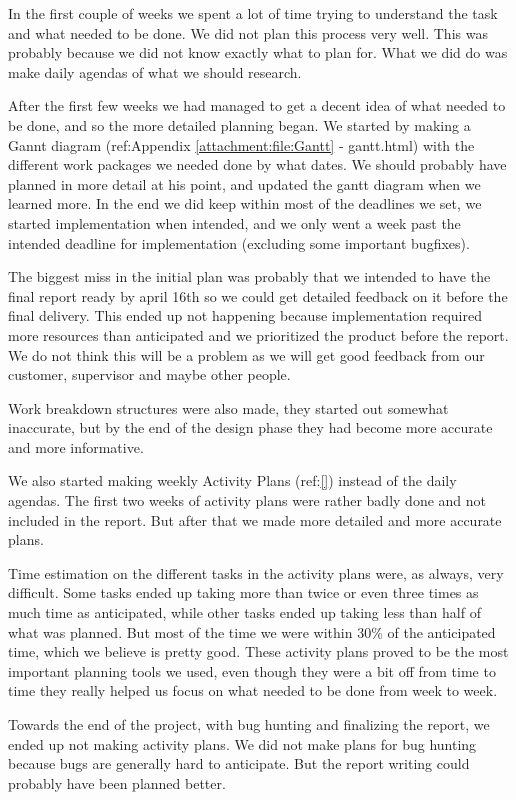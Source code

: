 In the first couple of weeks we spent a lot of time trying to understand the task and what needed to be done. We did not plan this process very well. This was probably because we did not know exactly what to plan for. What we did do was make daily agendas of what we should research.

After the first few weeks we had managed to get a decent idea of what needed to be done, and so the more detailed planning began. We started by making a Gannt diagram (ref:Appendix \ref{attachment:file:Gantt} - gantt.html) with the different work packages we needed done by what dates. We should probably have planned in more detail at his point, and updated the gantt diagram when we learned more. In the end we did keep within most of the deadlines we set, we started implementation when intended, and we only went a week past the intended deadline for implementation (excluding some important bugfixes). 

The biggest miss in the initial plan was probably that we intended to have the final report ready by april 16th so we could get detailed feedback on it before the final delivery. This ended up not happening because implementation required more resources than anticipated and we prioritized the product before the report. We do not think this will be a problem as we will get good feedback from our customer, supervisor and maybe other people.

Work breakdown structures were also made, they started out somewhat inaccurate, but by the end of the design phase they had become more accurate and more informative. 

We also started making weekly Activity Plans (ref:\ref{}) instead of the daily agendas. The first two weeks of activity plans were rather badly done and not included in the report. But after that we made more detailed and more accurate plans.

Time estimation on the different tasks in the activity plans were, as always, very difficult. Some tasks ended up taking more than twice or even three times as much time as anticipated, while other tasks ended up taking less than half of what was planned. But most of the time we were within 30\% of the anticipated time, which we believe is pretty good. These activity plans proved to be the most important planning tools we used, even though they were a bit off from time to time they really helped us focus on what needed to be done from week to week.

Towards the end of the project, with bug hunting and finalizing the report, we ended up not making activity plans. We did not make plans for bug hunting because bugs are generally hard to anticipate. But the report writing could probably have been planned better.